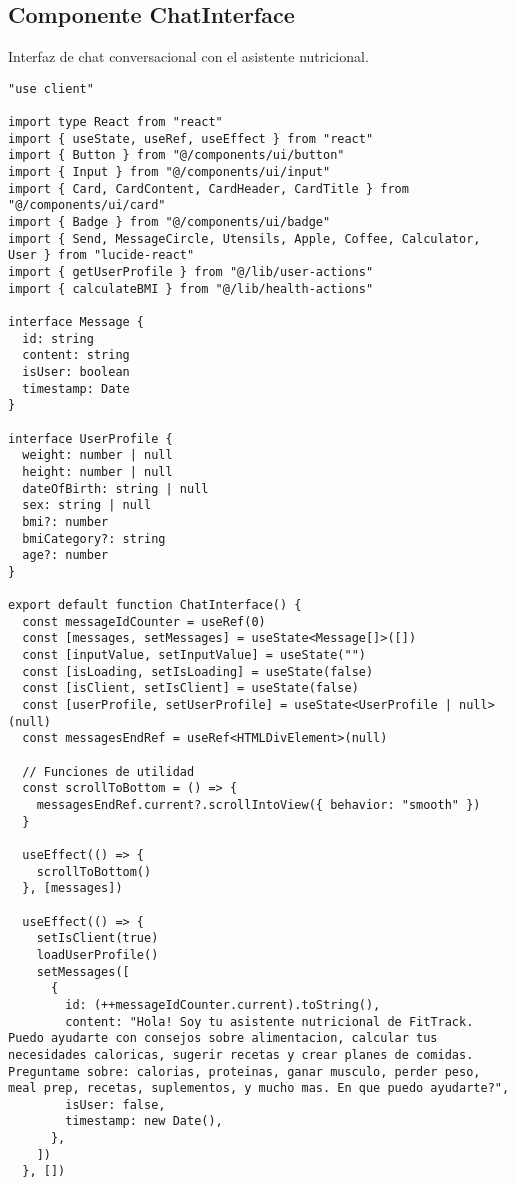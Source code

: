 \documentclass[12pt,a4paper]{article}
\begin{document}
\subsection{Componente ChatInterface}

Interfaz de chat conversacional con el asistente nutricional.

\begin{lstlisting}[caption=components/meals/chat-interface.tsx - Estructura principal]
"use client"

import type React from "react"
import { useState, useRef, useEffect } from "react"
import { Button } from "@/components/ui/button"
import { Input } from "@/components/ui/input"
import { Card, CardContent, CardHeader, CardTitle } from "@/components/ui/card"
import { Badge } from "@/components/ui/badge"
import { Send, MessageCircle, Utensils, Apple, Coffee, Calculator, User } from "lucide-react"
import { getUserProfile } from "@/lib/user-actions"
import { calculateBMI } from "@/lib/health-actions"

interface Message {
  id: string
  content: string
  isUser: boolean
  timestamp: Date
}

interface UserProfile {
  weight: number | null
  height: number | null
  dateOfBirth: string | null
  sex: string | null
  bmi?: number
  bmiCategory?: string
  age?: number
}

export default function ChatInterface() {
  const messageIdCounter = useRef(0)
  const [messages, setMessages] = useState<Message[]>([])
  const [inputValue, setInputValue] = useState("")
  const [isLoading, setIsLoading] = useState(false)
  const [isClient, setIsClient] = useState(false)
  const [userProfile, setUserProfile] = useState<UserProfile | null>(null)
  const messagesEndRef = useRef<HTMLDivElement>(null)

  // Funciones de utilidad
  const scrollToBottom = () => {
    messagesEndRef.current?.scrollIntoView({ behavior: "smooth" })
  }

  useEffect(() => {
    scrollToBottom()
  }, [messages])

  useEffect(() => {
    setIsClient(true)
    loadUserProfile()
    setMessages([
      {
        id: (++messageIdCounter.current).toString(),
        content: "Hola! Soy tu asistente nutricional de FitTrack. Puedo ayudarte con consejos sobre alimentacion, calcular tus necesidades caloricas, sugerir recetas y crear planes de comidas. Preguntame sobre: calorias, proteinas, ganar musculo, perder peso, meal prep, recetas, suplementos, y mucho mas. En que puedo ayudarte?",
        isUser: false,
        timestamp: new Date(),
      },
    ])
  }, [])


\end{lstlisting}
\end{document}
